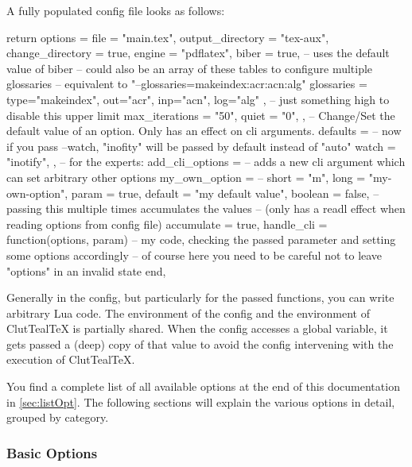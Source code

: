 \documentclass[a4paper, 11pt]{scrartcl}
\renewcommand*{\tcbdocnew}[1]{\textcolor{green!50!black}{\sffamily\bfseries N} #1}
\renewcommand*{\tcbdocupdated}[1]{\textcolor{blue!75!black}{\sffamily\bfseries U} #1}
\newcommand\CluttealTeX{ClutTeal\TeX\xspace}
\begin{document}
A fully populated config file looks as follows:
\begin{boxcodelua}
return {
	options = {
		file = "main.tex",
		output_directory = "tex-aux",
		change_directory = true,
		engine = "pdflatex",
		biber = true, -- uses the default value of biber
		-- could also be an array of these tables to configure multiple glossaries
		-- equivalent to "--glossaries=makeindex:acr:acn:alg"
		glossaries = {
			type="makeindex",
			out="acr",
			inp="acn",
			log="alg"
		},
		-- just something high to disable this upper limit
		max_iterations = "50",
		quiet = "0",
	},
	-- Change/Set the default value of an option. Only has an effect on cli arguments.
	defaults = {
		-- now if you pass --watch, "inofity" will be passed by default instead of "auto"
		watch = "inotify",
	},
	-- for the experts:
	add_cli_options = {
		-- adds a new cli argument which can set arbitrary other options
		my_own_option = {
			-- short = "m",
			long = "my-own-option",
			param = true,
			default = "my default value",
			boolean = false,
			-- passing this multiple times accumulates the values
			-- (only has a readl effect when reading options from config file)
			accumulate = true,
			handle_cli = function(options, param)
				-- my code, checking the passed parameter and setting some options accordingly
				-- of course here you need to be careful not to leave "options" in an invalid state
			end,
		}
	}
}
\end{boxcodelua}

Generally in the config, but particularly for the passed functions, you can write arbitrary Lua code.
The environment of the config and the environment of \CluttealTeX is partially shared.
When the config accesses a global variable, it gets passed a (deep) copy of that value to avoid the config intervening with the execution of \CluttealTeX.

You find a complete list of all available options at the end of this documentation in \cref{sec:listOpt}.
The following sections will explain the various options in detail, grouped by category.

\subsubsection{Basic Options}

\end{document}
